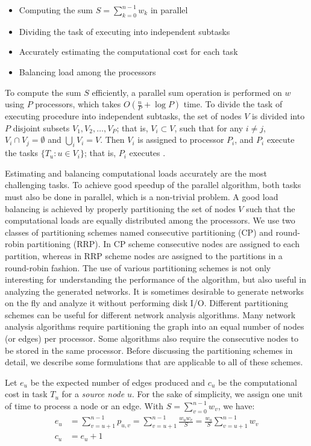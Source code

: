 \documentclass[conference,letterpaper,10pt]{IEEEtran}
\begin{document}
\begin{itemize}
\item Computing the sum $S = \sum_{k=0}^{n-1}{w_{k}}$ in parallel
\item Dividing the  task of executing  into independent subtasks
\item Accurately estimating the computational cost for each task
\item Balancing load among the processors 
\end{itemize}

To compute the sum $S$ efficiently, a parallel sum operation is performed on  $w$ using $P$ processors, which takes $O(\frac{n}{P}+\log{P})$ time. To divide the task of executing procedure  into independent subtasks, the set of nodes $V$ is divided into $P$ disjoint subsets $V_1,V_2,\ldots, V_P$; that is, $V_i \subset V$, such that for any $i \ne j$, $V_i \cap V_j = \emptyset$ and $\bigcup_i V_i=V$. Then $V_i$ is assigned to processor $P_{i}$, and $P_{i}$ execute the tasks $\{T_u : u \in V_i\}$; that is, $P_{i}$ executes . 

Estimating and balancing computational loads accurately are the most challenging tasks. To achieve good speedup of the parallel algorithm, both tasks must also be done in parallel, which is a non-trivial problem. A good load balancing is achieved by properly partitioning the set of nodes $V$ such that the computational loads are equally distributed among the processors. We use two classes of partitioning schemes named consecutive partitioning (CP) and round-robin partitioning (RRP). In CP scheme consecutive nodes are assigned to each partition, whereas in RRP scheme nodes are assigned to the partitions in a round-robin fashion. 
The use of various partitioning schemes is not only interesting for understanding the performance of the algorithm, but also useful in analyzing the generated networks. It is sometimes desirable to generate networks on the fly and analyze it without performing disk I/O. Different partitioning schemes can be useful for different network analysis algorithms. 
Many network analysis algorithms require partitioning the graph into an equal number of nodes (or edges) per processor. Some algorithms also require the consecutive nodes to be stored in the same processor.
Before discussing the partitioning schemes in detail, we describe some formulations that are applicable to all of these schemes.

Let $e_{u}$ be the expected number of edges produced and $c_{u}$ be the computational cost in task $T_{u}$ for a \textit{source node} $u$. For the sake of simplicity, we assign one unit of  time to process a node or an edge. With $S = \sum_{v=0}^{n-1}w_{v}$, we have:
\begin{align}
e_{u} &= \textstyle \sum_{v=u+1}^{n-1}p_{u,v}  =\sum_{v=u+1}^{n-1}\frac{w_{u}w_{v}}{S} =\frac{w_u}{S}\sum_{v=u+1}^{n-1}w_{v} \label{Equation:PCL:eu}\\
c_{u} &= \textstyle  e_{u} + 1 \label{Equation:PCL:cu}
\end{align}
\end{document}
